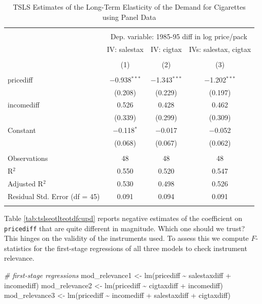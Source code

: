 \documentclass[
  14pt,
]{memoir}
\newenvironment{Shaded}{\begin{snugshade}}{\end{snugshade}}
\newcommand{\CommentTok}[1]{\textcolor[rgb]{0.56,0.35,0.01}{\textit{#1}}}
\newcommand{\FunctionTok}[1]{\textcolor[rgb]{0.00,0.00,0.00}{#1}}
\newcommand{\NormalTok}[1]{#1}
\newcommand{\OtherTok}[1]{\textcolor[rgb]{0.56,0.35,0.01}{#1}}
\newcommand{\SpecialCharTok}[1]{\textcolor[rgb]{0.00,0.00,0.00}{#1}}
\begin{document}
\begin{table}[!htbp] \centering 
  \caption{\label{tab:tslseotlteotdfcupd} TSLS Estimates of the Long-Term Elasticity of the Demand for Cigarettes using Panel Data} 
  \label{} 
\begin{tabular}{@{\extracolsep{0pt}}lccc} 
\\[-1.8ex]\hline 
\hline \\[-1.8ex] 
 & \multicolumn{3}{c}{Dep. variable: 1985-95 diff in log price/pack} \\ 
\cline{2-4} 
 & IV: salestax & IV: cigtax & IVs: salestax, cigtax \\ 
\\[-1.8ex] & (1) & (2) & (3)\\ 
\hline \\[-1.8ex] 
 pricediff & $-$0.938$^{***}$ & $-$1.343$^{***}$ & $-$1.202$^{***}$ \\ 
  & (0.208) & (0.229) & (0.197) \\ 
  incomediff & 0.526 & 0.428 & 0.462 \\ 
  & (0.339) & (0.299) & (0.309) \\ 
  Constant & $-$0.118$^{*}$ & $-$0.017 & $-$0.052 \\ 
  & (0.068) & (0.067) & (0.062) \\ 
 \hline \\[-1.8ex] 
Observations & 48 & 48 & 48 \\ 
R$^{2}$ & 0.550 & 0.520 & 0.547 \\ 
Adjusted R$^{2}$ & 0.530 & 0.498 & 0.526 \\ 
Residual Std. Error (df = 45) & 0.091 & 0.094 & 0.091 \\ 
\hline 
\hline \\[-1.8ex] 
\end{tabular} 
\end{table}

Table \ref{tab:tslseotlteotdfcupd} reports negative estimates of the coefficient on \texttt{pricediff} that are quite different in magnitude. Which one should we trust? This hinges on the validity of the instruments used. To assess this we compute \(F\)-statistics for the first-stage regressions of all three models to check instrument relevance.

\begin{Shaded}
\begin{Highlighting}[]
\CommentTok{\# first{-}stage regressions}
\NormalTok{mod\_relevance1 }\OtherTok{\textless{}{-}} \FunctionTok{lm}\NormalTok{(pricediff }\SpecialCharTok{\textasciitilde{}}\NormalTok{ salestaxdiff }\SpecialCharTok{+}\NormalTok{ incomediff)}
\NormalTok{mod\_relevance2 }\OtherTok{\textless{}{-}} \FunctionTok{lm}\NormalTok{(pricediff }\SpecialCharTok{\textasciitilde{}}\NormalTok{ cigtaxdiff   }\SpecialCharTok{+}\NormalTok{ incomediff)}
\NormalTok{mod\_relevance3 }\OtherTok{\textless{}{-}} \FunctionTok{lm}\NormalTok{(pricediff }\SpecialCharTok{\textasciitilde{}}\NormalTok{ incomediff   }\SpecialCharTok{+}\NormalTok{ salestaxdiff }\SpecialCharTok{+} 
\NormalTok{                                                cigtaxdiff)}
\end{Highlighting}
\end{Shaded}
\end{document}
